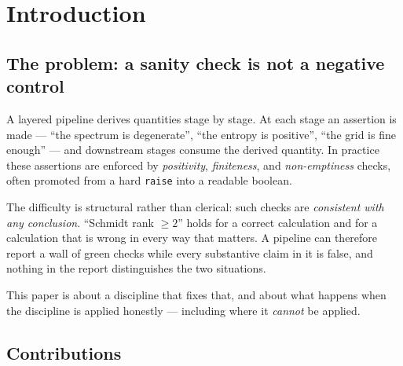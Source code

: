 \documentclass[11pt,a4paper]{article}
\newcommand{\code}[1]{\texttt{\small #1}}
\begin{document}
\section{Introduction}
\label{sec:intro}

\subsection{The problem: a sanity check is not a negative control}

A layered pipeline derives quantities stage by stage. At each stage an assertion is
made --- ``the spectrum is degenerate'', ``the entropy is positive'', ``the grid is
fine enough'' --- and downstream stages consume the derived quantity. In practice
these assertions are enforced by \emph{positivity}, \emph{finiteness}, and
\emph{non-emptiness} checks, often promoted from a hard \code{raise} into a
readable boolean.

The difficulty is structural rather than clerical: such checks are \emph{consistent
with any conclusion}. ``Schmidt rank $\ge 2$'' holds for a correct calculation and
for a calculation that is wrong in every way that matters. A pipeline can therefore
report a wall of green checks while every substantive claim in it is false, and
nothing in the report distinguishes the two situations.

This paper is about a discipline that fixes that, and about what happens when the
discipline is applied honestly --- including where it \emph{cannot} be applied.

\subsection{Contributions}
\end{document}
